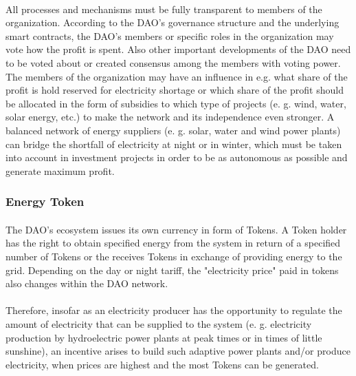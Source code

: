 \documentclass{scrartcl}
\begin{document}
	\paragraph{}
	All processes and mechanisms must be fully transparent to members of the organization. According to the DAO's governance structure and the underlying smart contracts, the DAO's members or specific roles in the organization may vote how the profit is spent. Also other important developments of the DAO need to be voted about or created consensus among the members with voting power. The members of the organization may have an influence in e.g. what share of the profit is hold reserved for electricity shortage or which share of the profit should be allocated in the form of subsidies to which type of projects (e. g. wind, water, solar energy, etc.) to make the network and its independence even stronger. A balanced network of energy suppliers (e. g. solar, water and wind power plants) can bridge the shortfall of electricity at night or in winter, which must be taken into account in investment projects in order to be as autonomous as possible and generate maximum profit.
	
	\subsubsection{Energy Token}
	
	\paragraph{}
	The DAO's ecosystem issues its own currency in form of Tokens. A Token holder has the right to obtain specified energy from the system in return of a specified number of Tokens or the receives Tokens in exchange of providing energy to the grid. Depending on the day or night tariff, the "electricity price" paid in tokens also changes within the DAO network. 
	
	\paragraph{}
	Therefore, insofar as an electricity producer has the opportunity to regulate the amount of electricity that can be supplied to the system (e. g. electricity production by hydroelectric power plants at peak times or in times of little sunshine), an incentive arises to build such adaptive power plants and/or produce electricity, when prices are highest and the most Tokens can be generated.
	
\end{document}
